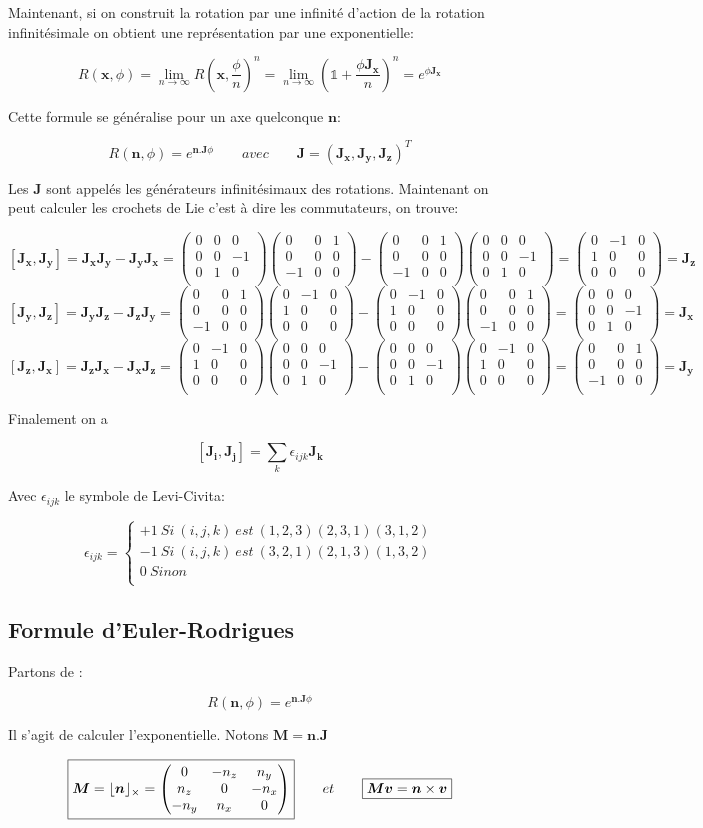 \documentclass[12pt,a4paper]{article}
\DeclarePairedDelimiter\floor{\lfloor}{\rfloor}
\newcommand{\unit}
{
\bm{\mathds{1}}
}
\newcommand{\Jx}
{
\begin{pmatrix}
	0&0&0\\
	0&0&-1\\
	0&1&0\\
\end{pmatrix}
}
\newcommand{\Jy}
{
	\begin{pmatrix}
		0&0&1\\
		0&0&0\\
		-1&0&0\\
	\end{pmatrix}
}
\newcommand{\Jz}
{
	\begin{pmatrix}
		0&-1&0\\
		1&0&0\\
		0&0&0\\
	\end{pmatrix}
}
\begin{document}
	Maintenant, si on construit la rotation par une infinité d'action de la rotation infinitésimale on obtient une représentation par une exponentielle:
	
	\[	
		R(\bm{x},\phi) = \lim_{n \to \infty} R\left(\bm{x},\frac{\phi}{n}\right)^n= \lim_{n \to \infty} \left( \unit+\frac{\phi \bm{J_x}}{n}\right)^n= e^{\phi \bm{J_x}}
	\]	
	
	Cette formule se généralise pour un axe quelconque $\bm{n}$:
	
	\[
		\boxed{R(\bm{n},\phi) = e^{\bm{n}.\bm{J} \phi} \quad \quad avec\quad\quad \bm{J}=(\bm{J_x},\bm{J_y},\bm{J_z})^T }
	\]
	
	Les $\bm{J}$ sont appelés les générateurs infinitésimaux des rotations. Maintenant on peut calculer les crochets de Lie c'est à dire les commutateurs, on trouve:
	
	\[
		[\bm{J_x},\bm{J_y}]=\bm{J_x}\bm{J_y}-\bm{J_y}\bm{J_x}=\Jx\Jy-\Jy\Jx=\Jz=\bm{J_z}
	\]
	\[
		[\bm{J_y},\bm{J_z}]=\bm{J_y}\bm{J_z}-\bm{J_z}\bm{J_y}=\Jy\Jz-\Jz\Jy=\Jx=\bm{J_x}
	\]
	\[
		[\bm{J_z},\bm{J_x}]=\bm{J_z}\bm{J_x}-\bm{J_x}\bm{J_z}=\Jz\Jx-\Jx\Jz=\Jy=\bm{J_y}
	\]
	
	Finalement on a 
	
	\[
		\boxed{[\bm{J_i},\bm{J_j}]=\sum_k \epsilon_{ijk}\bm{J_k}}
	\]
	
	Avec $\epsilon_{ijk}$ le symbole de Levi-Civita:
	
	\[
		\epsilon_{ijk}=\left\{
		\begin{array}{l}
		+1\ Si\ (i,j,k)\ est \ (1,2,3)(2,3,1)(3,1,2)\\
		-1\ Si\ (i,j,k)\ est \ (3,2,1)(2,1,3)(1,3,2)\\
		0\ Sinon\\
		\end{array}
		\right.
	\]
	
	\subsection{Formule d'Euler-Rodrigues}
	Partons de :
	
	\[
		R(\bm{n},\phi) = e^{\bm{n}.\bm{J} \phi}
	\]
	
	Il s'agit de calculer l'exponentielle. Notons $\bm{M}=\bm{n}.\bm{J}$
	
	\[
		\boxed{\bm{M}=\floor{\bm{n}}_{\times}=\begin{pmatrix}
			0&-n_z&n_y\\
			n_z&0&-n_x\\
			-n_y&n_x&0\\
			\end{pmatrix}}
		\quad\quad et \quad\quad \boxed{\bm{M}\bm{v}=\bm{n} \times \bm{v}}
	\]
	
\end{document}
